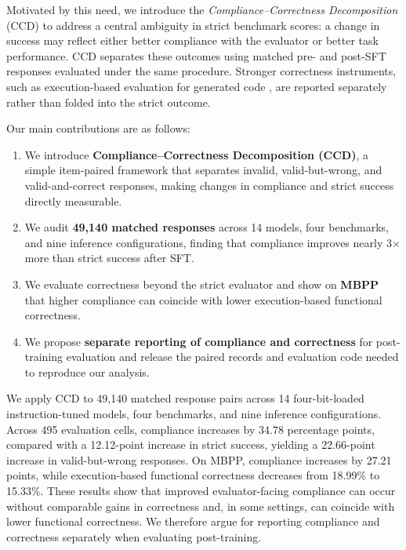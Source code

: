 \documentclass{article}
\begin{document}
Motivated by this need, we introduce the
\emph{Compliance--Correctness Decomposition} (CCD) to address a central
ambiguity in strict benchmark scores: a change in success may reflect either
better compliance with the evaluator or better task performance. CCD
separates these outcomes using matched pre- and post-SFT responses evaluated
under the same procedure. Stronger correctness instruments, such as
execution-based evaluation for generated code
\citep{austin2021program,liu2023evalplus}, are reported separately rather than
folded into the strict outcome.

Our main contributions are as follows:
%
\begin{enumerate}[
    leftmargin=1.2em,
    itemsep=0.3pt,
    topsep=0.3pt,
    parsep=0pt,
    partopsep=0pt
]
    \item We introduce \textbf{Compliance--Correctness Decomposition (CCD)},
    a simple item-paired framework that separates invalid, valid-but-wrong,
    and valid-and-correct responses, making changes in compliance and strict
    success directly measurable.

    \item We audit \textbf{49,140 matched responses} across 14 models, four
    benchmarks, and nine inference configurations, finding that compliance
    improves nearly 3$\times$ more than strict success after SFT.

    \item We evaluate correctness beyond the strict evaluator and show on
    \textbf{MBPP} that higher compliance can coincide with lower
    execution-based functional correctness.

    \item We propose \textbf{separate reporting of compliance and correctness}
    for post-training evaluation and release the paired records and evaluation
    code needed to reproduce our analysis.
\end{enumerate}

We apply CCD to 49,140 matched response pairs across 14 four-bit-loaded
instruction-tuned models, four benchmarks, and nine inference configurations.
Across 495 evaluation cells, compliance increases by 34.78 percentage points,
compared with a 12.12-point increase in strict success, yielding a 22.66-point
increase in valid-but-wrong responses. On MBPP, compliance increases by 27.21
points, while execution-based functional correctness decreases from 18.99\%
to 15.33\%. These results show that improved evaluator-facing compliance can
occur without comparable gains in correctness and, in some settings, can
coincide with lower functional correctness. We therefore argue for reporting
compliance and correctness separately when evaluating post-training.
\end{document}
